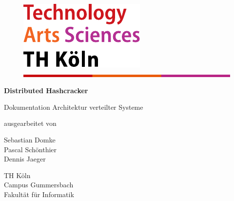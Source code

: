 
\begin{titlepage}

\begin{center}
\begin{figure}[!ht]
	\flushright
		\includegraphics[width=.2\textwidth]{images/logo.pdf}
		\includegraphics[width=\textwidth]{images/balken.png}
\end{figure}

\vspace{1.5cm}


\begin{rmfamily}
\begin{huge}
\textbf{Distributed Hashcracker}\\	
\end{huge}
\vspace{0.5cm}
\end{rmfamily}

\vspace{1.6cm}

\begin{LARGE}
\begin{scshape}
Dokumentation Architektur verteilter Systeme\\[0.8em]
\end{scshape}
\end{LARGE}

\begin{large}
ausgearbeitet von\\ 
\vspace{0.2cm}
\begin{LARGE}
Sebastian Domke\\
Pascal Schönthier\\
Dennis Jaeger\\
\end{LARGE}
\end{large}

\vspace{1.0cm}

\begin{large} 
\vspace{0.2cm}
\begin{scshape}
TH Köln\\
Campus Gummersbach\\
Fakultät für Informatik
\end{scshape}
\end{large}


\end{center}
\end{titlepage}
